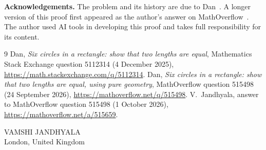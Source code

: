 \documentclass[11pt]{article}
\begin{document}
\textbf{Acknowledgements.} The problem and its history are due to Dan~\cite{MSE,MO}. A longer version of this proof first appeared as the author's answer on MathOverflow~\cite{MOA}. The author used AI tools in developing this proof and takes full responsibility for its content.

\begin{thebibliography}{9}
 Dan, \emph{Six circles in a rectangle: show that two lengths are equal}, Mathematics Stack Exchange question 5112314 (4 December 2025), \url{https://math.stackexchange.com/q/5112314}.
 Dan, \emph{Six circles in a rectangle: show that two lengths are equal, using pure geometry}, MathOverflow question 515498 (24 September 2026), \url{https://mathoverflow.net/q/515498}.
 V.~Jandhyala, answer to MathOverflow question 515498 (1 October 2026), \url{https://mathoverflow.net/a/515659}.
\end{thebibliography}

\bigskip
\noindent VAMSHI JANDHYALA\\
London, United Kingdom
\end{document}

